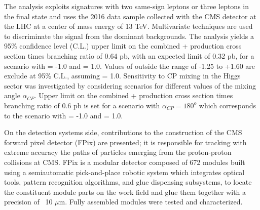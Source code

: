 \footnotesize
The analysis exploits signatures with two same-sign leptons or three leptons in the final state and uses the 2016 data sample collected with the CMS detector at the LHC at a center of mass energy of 13 TeV. Multivariate techniques are used to discriminate the signal from the dominant backgrounds. The analysis yields a 95\% confidence level (C.L.) upper limit on the combined \tH + \ttH production cross section times branching ratio of 0.64 pb, with an expected limit of 0.32 pb, for a scenario with \Ct = -1.0 and \CV = 1.0. Values of \Ct outside the range of -1.25 to +1.60 are exclude at 95\% C.L., assuming \CV = 1.0. Sensitivity to CP mixing in the Higgs sector was investigated by considering scenarios for different values of the mixing angle $\alpha_{CP}$. Upper limit on the combined \tH + \ttH production cross section times branching ratio of 0.6 pb is set for a scenario with $\alpha_{CP}=180^o$ which corresponds to the scenario with \Ct = -1.0 and \CV = 1.0.

On the detection systems side, contributions to the construction of the CMS forward pixel detector (FPix) are presented; it is responsible for tracking with extreme accuracy the paths of particles emerging from the proton-proton collisions at CMS. FPix is a modular detector composed of 672 modules built using a semiautomatic pick-and-place robotic system which integrates optical tools, pattern recognition algorithms, and glue dispensing subsystems, to locate the constituent module parts on the work field and glue them together with a precision of ~10 $\mu$m. Fully assembled modules were tested and characterized.
